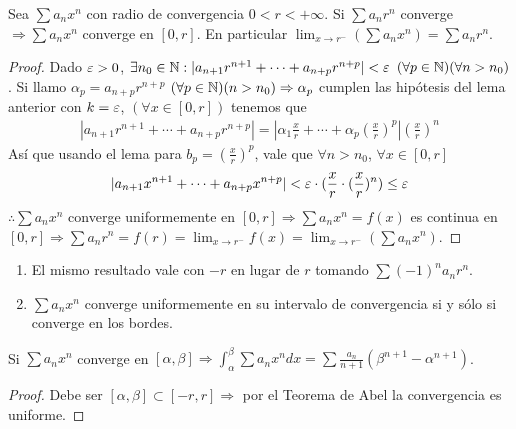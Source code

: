 \begin{theorem}[Abel]
  Sea \(\sum a_n x^n\) con radio de convergencia \(0 < r < +\infty\). Si \(\sum a_n r^n\) converge \(\Rightarrow \sum a_n x^n\) converge en \([0, r]\). En particular \(\lim_{x \to r^-} (\sum a_n x^n) = \sum a_n r^n\).
  \begin{proof}
    Dado \(\varepsilon > 0\), \(\exists n_0 \in \mathbb{N} : |a_{n+1} r^{n+1} + \cdots + a_{n+p} r^{n+p}| < \varepsilon\) \((\forall p \in \mathbb{N}) (\forall n > n_0)\). Si llamo \(\alpha_p = a_{n+p} r^{n+p}\) \((\forall p \in \mathbb{N})(n > n_0) \Rightarrow \alpha_p\)
    cumplen las hipótesis del lema anterior con \(k = \varepsilon\), \((\forall x \in [0, r])\) tenemos que \begin{align*}
      |a_{n+1} r^{n+1} + \cdots + a_{n+p} r^{n+p}| = |\alpha_1 \frac{x}{r} + \cdots + \alpha_p (\frac{x}{r})^p| (\frac{x}{r})^n
    \end{align*} Así que usando el lema para \(b_p = (\frac{x}{r})^p\), vale que \(\forall n > n_0\), \(\forall x \in [0, r]\)
    \begin{align*}
      |a_{n+1} x^{n+1} + \cdots + a_{n + p} x^{n+p}| < \varepsilon \cdot (\frac{x}{r} \cdot (\frac{x}{r})^n) \leq \varepsilon
    \end{align*} \(\therefore \sum a_n x^n\) converge uniformemente en \([0, r] \Rightarrow \sum a_n x^n = f(x)\) es continua en \([0, r] \Rightarrow \sum a_n r^n = f(r) = \lim_{x \to r^-} f(x) = \lim_{x \to r^-} (\sum a_n x^n)\).
  \end{proof}
\end{theorem}

\begin{note}
  \begin{enumerate}
    \item El mismo resultado vale con \(-r\) en lugar de \(r\) tomando \(\sum (-1)^n a_n r^n\).
    \item \(\sum a_n x^n\) converge uniformemente en su intervalo de convergencia si y sólo si converge en los bordes.
  \end{enumerate}
\end{note}

\begin{theorem}
  Si \(\sum a_n x^n\) converge en \([\alpha, \beta] \Rightarrow \int_{\alpha}^{\beta} \sum a_n x^n dx = \sum \frac{a_n}{n+1} (\beta^{n+1} - \alpha^{n+1})\).
  \begin{proof}
    Debe ser \([\alpha, \beta] \subset [-r, r] \Rightarrow\) por el Teorema de Abel la convergencia es uniforme.
  \end{proof}
\end{theorem}

